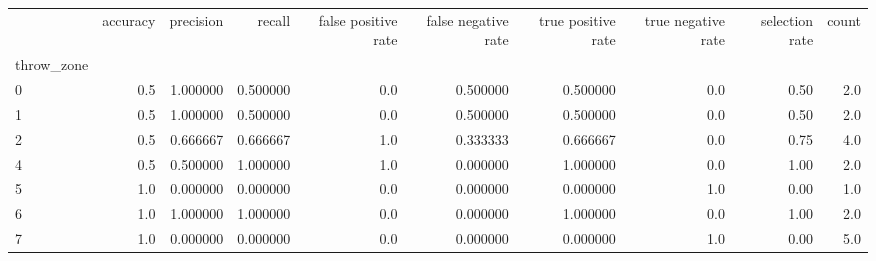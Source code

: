 \begin{tabular}{lrrrrrrrrr}
\toprule
{} &  accuracy &  precision &    recall &  false positive rate &  false negative rate &  true positive rate &  true negative rate &  selection rate &  count \\
throw\_zone &           &            &           &                      &                      &                     &                     &                 &        \\
\midrule
0          &       0.5 &   1.000000 &  0.500000 &                  0.0 &             0.500000 &            0.500000 &                 0.0 &            0.50 &    2.0 \\
1          &       0.5 &   1.000000 &  0.500000 &                  0.0 &             0.500000 &            0.500000 &                 0.0 &            0.50 &    2.0 \\
2          &       0.5 &   0.666667 &  0.666667 &                  1.0 &             0.333333 &            0.666667 &                 0.0 &            0.75 &    4.0 \\
4          &       0.5 &   0.500000 &  1.000000 &                  1.0 &             0.000000 &            1.000000 &                 0.0 &            1.00 &    2.0 \\
5          &       1.0 &   0.000000 &  0.000000 &                  0.0 &             0.000000 &            0.000000 &                 1.0 &            0.00 &    1.0 \\
6          &       1.0 &   1.000000 &  1.000000 &                  0.0 &             0.000000 &            1.000000 &                 0.0 &            1.00 &    2.0 \\
7          &       1.0 &   0.000000 &  0.000000 &                  0.0 &             0.000000 &            0.000000 &                 1.0 &            0.00 &    5.0 \\
\bottomrule
\end{tabular}
